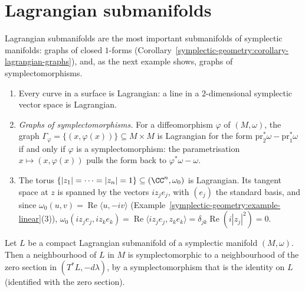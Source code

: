 \section{Lagrangian submanifolds}\label{symplectic-geometry:section-lagrangian}

Lagrangian submanifolds are the most important submanifolds of symplectic manifolds: graphs of closed $1$-forms (Corollary~\ref{symplectic-geometry:corollary-lagrangian-graphs}), and, as the next example
shows, graphs of symplectomorphisms.

\begin{example}\label{symplectic-geometry:example-lagrangian}
\begin{enumerate}
\item Every curve in a surface is Lagrangian: a line in a $2$-dimensional symplectic vector space is Lagrangian.
\item \emph{Graphs of symplectomorphisms.} For a diffeomorphism $\varphi$ of $(M, \omega)$, the graph $\Gamma_\varphi = \{(x, \varphi(x))\} \subseteq M \times M$ is Lagrangian for the form
$\mathrm{pr}_2^*\omega - \mathrm{pr}_1^*\omega$ if and only if $\varphi$ is a symplectomorphism: the parametrisation $x \mapsto (x, \varphi(x))$ pulls the form back to $\varphi^*\omega - \omega$.
\item The torus $\{|z_1| = \cdots = |z_n| = 1\} \subseteq (\CC^n, \omega_0)$ is Lagrangian. Its tangent space at $z$ is spanned by the vectors $iz_je_j$, with $(e_j)$ the standard basis, and since
$\omega_0(u, v) = \operatorname{Re}\langle u, -iv\rangle$ (Example~\ref{symplectic-geometry:example-linear}(3)), $\omega_0(iz_je_j, iz_ke_k) = \operatorname{Re}\langle iz_je_j, z_ke_k\rangle = \delta_{jk}\operatorname{Re}(i|z_j|^2) = 0$.
\end{enumerate}
\end{example}

\begin{theorem}\label{symplectic-geometry:theorem-weinstein}
Let $L$ be a compact Lagrangian submanifold of a symplectic manifold $(M, \omega)$. Then a neighbourhood of $L$ in $M$ is symplectomorphic to a neighbourhood of the zero section in $(T^*L, -d\lambda)$, by a
symplectomorphism that is the identity on $L$ (identified with the zero section).
\end{theorem}


